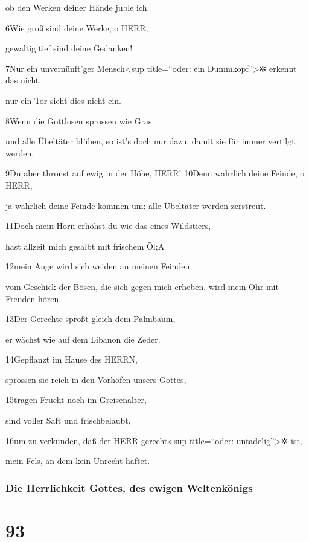 ob den Werken deiner Hände juble ich.

6Wie groß sind deine Werke, o HERR,

gewaltig tief sind deine Gedanken!

7Nur ein unvernünft'ger Mensch\textless sup title=``oder: ein
Dummkopf''\textgreater✲ erkennt das nicht,

nur ein Tor sieht dies nicht ein.

8Wenn die Gottlosen sprossen wie Gras

und alle Übeltäter blühen, so ist's doch nur dazu, damit sie für immer
vertilgt werden.

9Du aber thronst auf ewig in der Höhe, HERR! 10Denn wahrlich deine
Feinde, o HERR,

ja wahrlich deine Feinde kommen um: alle Übeltäter werden zerstreut.

11Doch mein Horn erhöhst du wie das eines Wildstiers,

hast allzeit mich gesalbt mit frischem Öl;{A}

12mein Auge wird sich weiden an meinen Feinden;

vom Geschick der Bösen, die sich gegen mich erheben, wird mein Ohr mit
Freuden hören.

13Der Gerechte sproßt gleich dem Palmbaum,

er wächst wie auf dem Libanon die Zeder.

14Gepflanzt im Hause des HERRN,

sprossen sie reich in den Vorhöfen unsers Gottes,

15tragen Frucht noch im Greisenalter,

sind voller Saft und frischbelaubt,

16um zu verkünden, daß der HERR gerecht\textless sup title=``oder:
untadelig''\textgreater✲ ist,

mein Fels, an dem kein Unrecht haftet.

\hypertarget{die-herrlichkeit-gottes-des-ewigen-weltenkuxf6nigs}{%
\subsubsection{Die Herrlichkeit Gottes, des ewigen
Weltenkönigs}\label{die-herrlichkeit-gottes-des-ewigen-weltenkuxf6nigs}}

\hypertarget{section-92}{%
\section{93}\label{section-92}}

